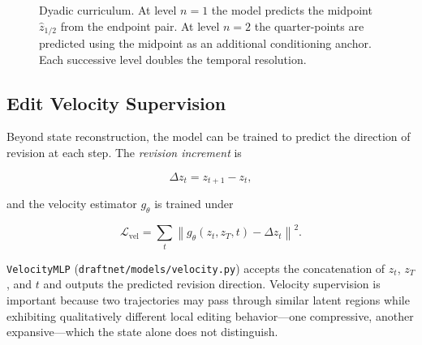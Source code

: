 \documentclass[12pt,a4paper]{article}
\theoremstyle{draftthm}
\newcommand{\norm}[1]{\left\|#1\right\|}
\newcommand{\dz}{\Delta z}
\newcommand{\code}[1]{\texttt{\small #1}}
\begin{document}
\begin{figure}[h]
\centering
{}
\caption{Dyadic curriculum. At level $n=1$ the model predicts the midpoint $\hat z_{1/2}$ from the endpoint pair. At level $n=2$ the quarter-points are predicted using the midpoint as an additional conditioning anchor. Each successive level doubles the temporal resolution.}
\label{fig:dyadic}
\end{figure}

\subsection{Edit Velocity Supervision}

Beyond state reconstruction, the model can be trained to predict the direction of revision at each step. The \emph{revision increment} is

\begin{equation}
  \dz_t = z_{t+1} - z_t,
\end{equation}

and the velocity estimator $g_{\theta}$ is trained under

\begin{equation}
  \mathcal{L}_{\mathrm{vel}}
  =
  \sum_t
  \norm{g_{\theta}(z_t, z_T, t) - \dz_t}^2.
  \label{eq:velocity-loss}
\end{equation}

\code{VelocityMLP} (\code{draftnet/models/velocity.py}) accepts the concatenation of $z_t$, $z_T$, and $t$ and outputs the predicted revision direction. Velocity supervision is important because two trajectories may pass through similar latent regions while exhibiting qualitatively different local editing behavior---one compressive, another expansive---which the state alone does not distinguish.
\end{document}
